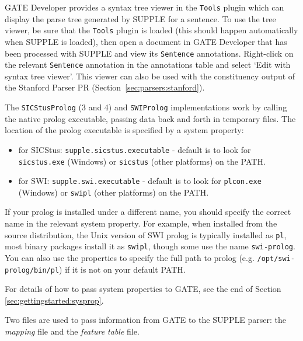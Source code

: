 GATE Developer provides a syntax tree viewer in the \texttt{Tools} plugin which
can display the parse tree generated by SUPPLE for a sentence.  To use the tree
viewer, be sure that the \texttt{Tools} plugin is loaded (this should happen
automatically when SUPPLE is loaded), then open a document in GATE
Developer that has been processed with SUPPLE and view its \texttt{Sentence}
annotations.  Right-click on the relevant \texttt{Sentence} annotation in the
annotations table and select `Edit with syntax tree viewer'.  This viewer can
also be used with the constituency output of the Stanford Parser PR
(Section~\ref{sec:parsers:stanford}).



The \texttt{SICStusProlog} (3 and 4) and \texttt{SWIProlog} implementations
work by calling the native prolog executable, passing data back and forth in
temporary files.  The location of the prolog executable is specified by a
system property:
%
\begin{itemize}
\item for SICStus: \texttt{supple.sicstus.executable} - default is to look for
\texttt{sicstus.exe} (Windows) or \texttt{sicstus} (other platforms) on the
PATH.
\item for SWI: \texttt{supple.swi.executable} - default is to look for
\texttt{plcon.exe} (Windows) or \texttt{swipl} (other platforms) on the PATH.
\end{itemize}

If your prolog is installed under a different name, you should specify the
correct name in the relevant system property.  For example, when installed from
the source distribution, the Unix version of SWI prolog is typically installed
as \texttt{pl}, most binary packages install it as \texttt{swipl}, though some
use the name \texttt{swi-prolog}.  You can also use the properties to specify
the full path to prolog (e.g. \texttt{/opt/swi-prolog/bin/pl}) if it is not on
your default PATH.

For details of how to pass system properties to GATE, see
the end of Section \ref{sec:gettingstarted:sysprop}.


Two files are used to pass information from GATE to the SUPPLE
parser: the {\em mapping} file and the {\em feature table} file.\\

